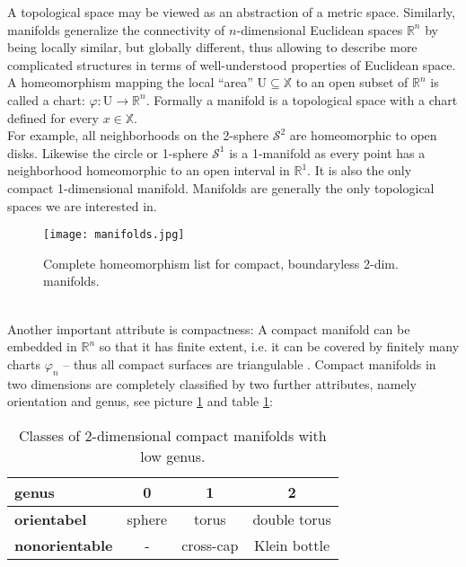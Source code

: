 A topological space may be viewed as an abstraction of a metric space.
Similarly, manifolds generalize the connectivity of $n$-dimensional Euclidean spaces $\mathbb{R}^{n}$ by being locally similar, but globally different, thus allowing to describe more complicated structures in terms of well-understood properties of Euclidean space.
A homeomorphism mapping the local ``area'' $\mathrm{U} \subseteq \mathbb{X}$ to an open subset of $\mathbb{R}^{n}$ is called a chart: $\varphi : \mathrm{U} \rightarrow \mathbb{R}^{n}$.
Formally a manifold is a topological space with a chart defined for every $x \in \mathbb{X}$.\\
For example, all neighborhoods on the 2-sphere $\mathcal{S}^{2}$ are homeomorphic to open disks.
Likewise the circle or 1-sphere $\mathcal{S}^{1}$ is a 1-manifold as every point has a neighborhood homeomorphic to an open interval in $\mathbb{R}^{1}$.
It is also the only compact 1-dimensional manifold.
Manifolds are generally the only topological spaces we are interested in.
\begin{figure}[ht]
\centering
\texttt{[image: manifolds.jpg]}
\caption{Complete homeomorphism list for compact, boundaryless 2-dim. manifolds.}
\label{fig:manifolds}
\end{figure}\\
Another important attribute is compactness: A compact manifold can be embedded in $\mathbb{R}^{n}$ so that it has finite extent, i.e. it can be covered by finitely many charts $\varphi_{n}$ -- thus all compact surfaces are triangulable \citep[which was first shown by][]{Rado1925}.
Compact manifolds in two dimensions are completely classified by two further attributes, namely orientation and genus, see picture \ref{fig:manifolds} and table \ref{tab:manifolds}:
\begin{table}[hbt]
\medskip
\setlength{\tabcolsep}{15pt}
\renewcommand{\arraystretch}{1.0}
   \centering
\begin{tabular}{ l || c | c | c } \centering
	\textbf{genus}		& 0			& 1				& 2 \\ \hline \hline
	\textbf{orientabel}	& sphere		& torus 			& double torus \\ \hline
	\textbf{nonorientable}	& -			& cross-cap		& Klein bottle \\
\end{tabular}
   \medskip
   \caption{Classes of 2-dimensional compact manifolds with low genus.}
   \label{tab:manifolds}
\end{table}\\
